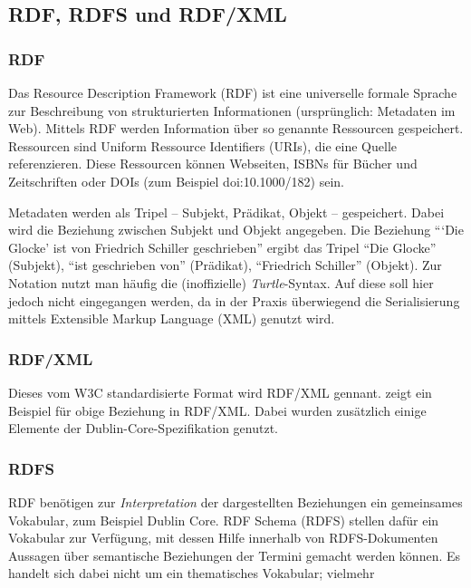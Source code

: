 	\subsection{RDF, RDFS und RDF/XML}
	\subsubsection{RDF}
	Das Resource Description Framework (RDF) ist eine universelle formale Sprache zur Beschreibung von strukturierten Informationen (ursprünglich: Metadaten im Web). Mittels RDF werden Information über so genannte Ressourcen gespeichert. Ressourcen sind Uniform Ressource Identifiers (URIs), die eine Quelle referenzieren. Diese Ressourcen können Webseiten, ISBNs für Bücher und Zeitschriften oder DOIs (zum Beispiel doi:10.1000/182) sein.
	
	Metadaten werden als Tripel -- Subjekt, Prädikat, Objekt -- gespeichert. Dabei wird die Beziehung zwischen Subjekt und Objekt angegeben. Die Beziehung \enquote{\enquote{Die Glocke} ist von Friedrich Schiller geschrieben} ergibt das Tripel \enquote{Die Glocke} (Subjekt), \enquote{ist geschrieben von} (Prädikat), \enquote{Friedrich Schiller} (Objekt). Zur Notation nutzt man häufig die (inoffizielle) \emph{Turtle}-Syntax. %
	Auf diese soll hier jedoch nicht eingegangen werden, da in der Praxis überwiegend die Serialisierung mittels Extensible Markup Language (XML) genutzt wird.
	
	\subsubsection{RDF/XML}
	Dieses vom W3C standardisierte Format wird RDF/XML gennant.  zeigt ein Beispiel für obige Beziehung in RDF/XML. Dabei wurden zusätzlich einige Elemente der Dublin-Core-Spezifikation genutzt.
	

	\subsubsection{RDFS}
	RDF benötigen zur \emph{Interpretation} der dargestellten Beziehungen ein gemeinsames Vokabular, zum Beispiel Dublin Core. RDF Schema (RDFS) stellen dafür ein Vokabular zur Verfügung, mit dessen Hilfe innerhalb von RDFS-Dokumenten Aussagen über semantische Beziehungen der Termini gemacht werden können. Es handelt sich dabei nicht um ein thematisches Vokabular; vielmehr 


